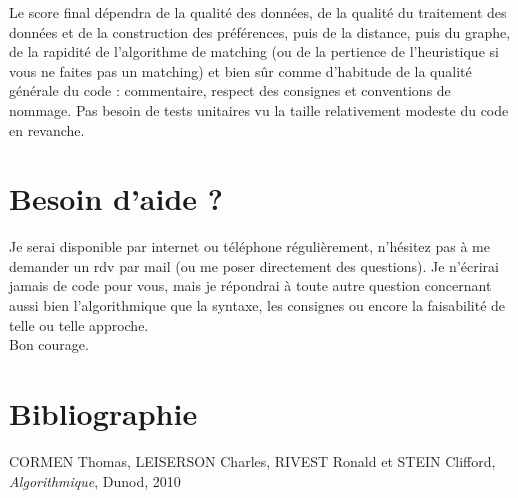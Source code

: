 \documentclass[a4paper,11pt]{article}
\begin{document}
Le score final dépendra de la qualité des données, de la qualité du traitement des données et de la construction des préférences, puis de la distance, puis du graphe, de la rapidité de l'algorithme de matching (ou de la pertience de l'heuristique si vous ne faites pas un matching) et bien sûr comme d'habitude de la qualité générale du code : commentaire, respect des consignes et conventions de nommage. Pas besoin de tests unitaires vu la taille relativement modeste du code en revanche.

\section{Besoin d'aide ?}

Je serai disponible par internet ou téléphone régulièrement, n'hésitez pas à me demander un rdv par mail (ou me poser directement des questions). Je n'écrirai jamais de code pour vous, mais je répondrai à toute autre question concernant aussi bien l'algorithmique que la syntaxe, les consignes ou encore la faisabilité de telle ou telle approche.\\

Bon courage.

\section{Bibliographie}

CORMEN Thomas, LEISERSON Charles, RIVEST Ronald et STEIN Clifford, \textit{Algorithmique}, Dunod, 2010\\
\end{document}
